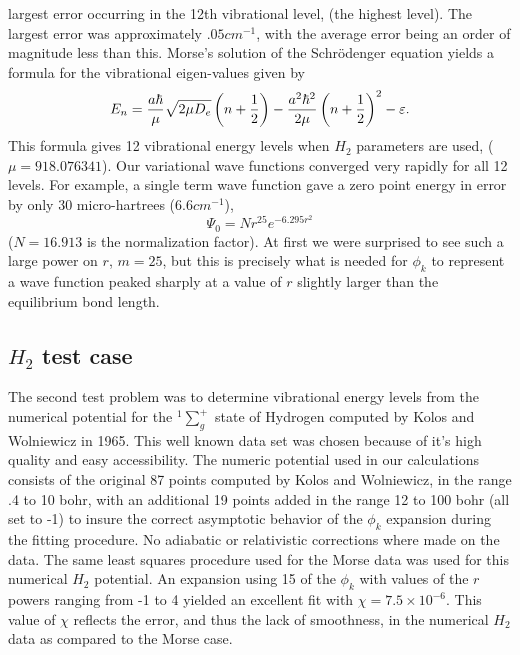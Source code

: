 \documentclass[12pt,thmsa]{article}
\begin{document}
largest error occurring in the 12th vibrational level, (the highest level).
The largest error was approximately $.05cm^{-1}$, with the average error
being an order of magnitude less than this. Morse's solution of the
Schr\"{o}denger equation yields a formula for the vibrational eigen-values
given by 
\begin{equation}
E_n=\frac{a\hbar }\mu \sqrt{2\mu D_e}\left( n+\frac 12\right) -\frac{%
a^2\hbar ^2}{2\mu }\left( n+\frac 12\right) ^2-\varepsilon .
\end{equation}
This formula gives 12 vibrational energy levels when $H_2$ parameters are
used, ($\mu =918.076341$). Our variational wave functions converged very
rapidly for all 12 levels. For example, a single term wave function gave a
zero point energy in error by only 30 micro-hartrees (6.6$cm^{-1}$), 
\begin{equation}
\Psi _0=Nr^{25}e^{-6.295r^2}
\end{equation}
($N=16.913$ is the normalization factor). At first we were surprised to see
such a large power on $r$, $m=25$, but this is precisely what is needed for $%
\phi _k$ to represent a wave function peaked sharply at a value of $r$
slightly larger than the equilibrium bond length.

\subsection{$H_2$ test case}

The second test problem was to determine vibrational energy levels from the
numerical potential for the $^1\sum_g^{+}$ state of Hydrogen computed by
Kolos and Wolniewicz in 1965\cite{Kolos65}. This well known data set was
chosen because of it's high quality and easy accessibility. The numeric
potential used in our calculations consists of the original 87 points
computed by Kolos and Wolniewicz, in the range .4 to 10 bohr, with an
additional 19 points added in the range 12 to 100 bohr (all set to -1) to
insure the correct asymptotic behavior of the $\phi _k$ expansion during the
fitting procedure. No adiabatic or relativistic corrections where made on
the data. The same least squares procedure used for the Morse data was used
for this numerical $H_2$ potential. An expansion using 15 of the $\phi _k$
with values of the $r$ powers ranging from -1 to 4 yielded an excellent fit
with $\chi =7.5\times 10^{-6}.$ This value of $\chi $ reflects the error,
and thus the lack of smoothness, in the numerical $H_2$ data as compared to
the Morse case.
\end{document}
